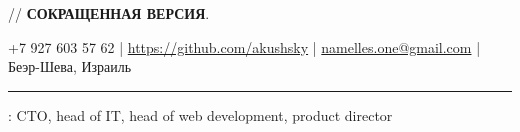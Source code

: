 \documentclass[11pt]{article}
\newif\ifdetailed
\begin{document}
%
\ifdetailed
{\small{// {\textbf{ПОЛНАЯ ВЕРСИЯ}}. }}
\else
{\small{// {\textbf{СОКРАЩЕННАЯ ВЕРСИЯ}}. }}
\fi

\vspace{0.5em}

\noindent +7 927 603 57 62    |    \url{https://github.com/akushsky}   |   \href{mailto:namelles.one@gmail.com}{namelles.one@gmail.com}  |  Беэр-Шева, Израиль  \ifdetailed | 27 мая 1988 \fi

\vspace{0.5em}

\hrule

\vspace{1.5em}

\ifdetailed
\noindent {\textbf{ЦЕЛЬ}}: Работа в крупной стабильной IT-компании в роли технического директора, руководителя разработки ПО, тех-нологического евангелиста, в роли технической поддержки продаж, руководителя подразделения, менеджера крупногоIT-проекта.
\else
{}: CTO, head of IT, head of web development, product director
\fi

\vspace{1em}
\end{document}
